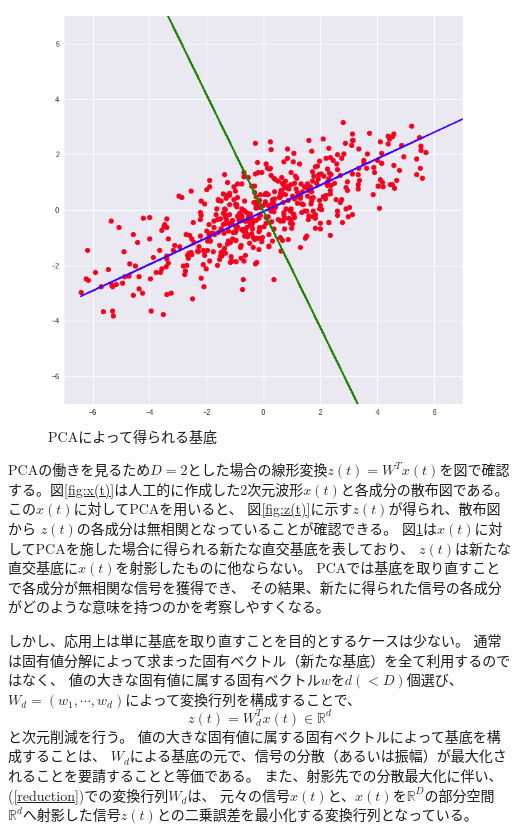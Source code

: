 \begin{figure}
    \centering
    \includegraphics[width=12cm]{images/z=Wx.png}
    \caption{PCAによって得られる基底}
    \label{fig:z=Wx}
\end{figure}

PCAの働きを見るため\(D=2\)とした場合の線形変換\(z(t)=W^Tx(t)\)を図で確認する。図\ref{fig:x(t)}は人工的に作成した2次元波形\(x(t)\)と各成分の散布図である。
この\(x(t)\)に対してPCAを用いると、
図\ref{fig:z(t)}に示す\(z(t)\)が得られ、散布図から
\(z(t)\)の各成分は無相関となっていることが確認できる。
図\ref{fig:z=Wx}は\(x(t)\)に対してPCAを施した場合に得られる新たな直交基底を表しており、
\(z(t)\)は新たな直交基底に\(x(t)\)を射影したものに他ならない。
PCAでは基底を取り直すことで各成分が無相関な信号を獲得でき、
その結果、新たに得られた信号の各成分がどのような意味を持つのかを考察しやすくなる。

しかし、応用上は単に基底を取り直すことを目的とするケースは少ない。
通常は固有値分解によって求まった固有ベクトル（新たな基底）を全て利用するのではなく、
値の大きな固有値に属する固有ベクトル\(w\)を\(d(<D)\)個選び、
\(W_{d} = (w_1, \cdots, w_d)\)によって変換行列を構成することで、
\begin{equation}
    z(t)=W_{d}^Tx(t) \in \mathbb R^d
    \label{reduction}
\end{equation}
と次元削減を行う。
値の大きな固有値に属する固有ベクトルによって基底を構成することは、
\(W_d\)による基底の元で、信号の分散（あるいは振幅）が最大化されることを要請することと等価である。
また、射影先での分散最大化に伴い、(\ref{reduction})での変換行列\(W_d\)は、
元々の信号\(x(t)\)と、\(x(t)\)を\(\mathbb R^D\)の部分空間
\(\mathbb R^d\)へ射影した信号\(z(t)\)との二乗誤差を最小化する変換行列となっている。


